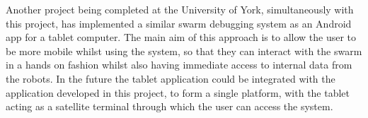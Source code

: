 Another project being completed at the University of York, simultaneously with this project, has implemented a similar swarm debugging system as an Android app for a tablet computer. The main aim of this approach is to allow the user to be more mobile whilst using the system, so that they can interact with the swarm in a hands on fashion whilst also having immediate access to internal data from the robots. In the future the tablet application could be integrated with the application developed in this project, to form a single platform, with the tablet acting as a satellite terminal through which the user can access the system.

